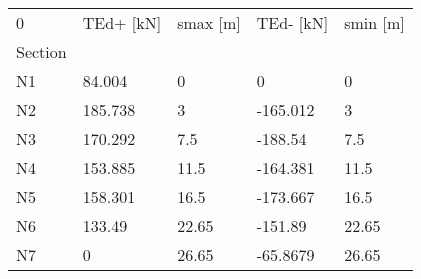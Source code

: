 \begin{tabular}{lllll}
\toprule
0 & TEd+ [kN] & smax [m] & TEd- [kN] & smin [m] \\
Section &           &          &           &          \\
\midrule
N1      &    84.004 &        0 &         0 &        0 \\
N2      &   185.738 &        3 &  -165.012 &        3 \\
N3      &   170.292 &      7.5 &   -188.54 &      7.5 \\
N4      &   153.885 &     11.5 &  -164.381 &     11.5 \\
N5      &   158.301 &     16.5 &  -173.667 &     16.5 \\
N6      &    133.49 &    22.65 &   -151.89 &    22.65 \\
N7      &         0 &    26.65 &  -65.8679 &    26.65 \\
\bottomrule
\end{tabular}
